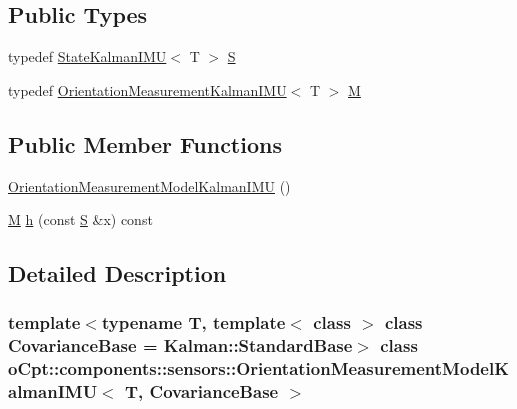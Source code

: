 \subsection*{Public Types}
\begin{DoxyCompactItemize}
\item 
typedef \hyperlink{classo_cpt_1_1components_1_1sensors_1_1_state_kalman_i_m_u}{State\+Kalman\+I\+MU}$<$ T $>$ \hyperlink{classo_cpt_1_1components_1_1sensors_1_1_orientation_measurement_model_kalman_i_m_u_a3104263971226357108cef704d272f90}{S}
\item 
typedef \hyperlink{classo_cpt_1_1components_1_1sensors_1_1_orientation_measurement_kalman_i_m_u}{Orientation\+Measurement\+Kalman\+I\+MU}$<$ T $>$ \hyperlink{classo_cpt_1_1components_1_1sensors_1_1_orientation_measurement_model_kalman_i_m_u_aa47a5c6cf0a9125a5ed587a7fefef876}{M}
\end{DoxyCompactItemize}
\subsection*{Public Member Functions}
\begin{DoxyCompactItemize}
\item 
\hyperlink{classo_cpt_1_1components_1_1sensors_1_1_orientation_measurement_model_kalman_i_m_u_ac1eccbf84f5f25954cdadcb1a5e474b1}{Orientation\+Measurement\+Model\+Kalman\+I\+MU} ()
\item 
\hyperlink{classo_cpt_1_1components_1_1sensors_1_1_orientation_measurement_model_kalman_i_m_u_aa47a5c6cf0a9125a5ed587a7fefef876}{M} \hyperlink{classo_cpt_1_1components_1_1sensors_1_1_orientation_measurement_model_kalman_i_m_u_a8d3bb87295520e0d4b5f02975fa420f0}{h} (const \hyperlink{classo_cpt_1_1components_1_1sensors_1_1_orientation_measurement_model_kalman_i_m_u_a3104263971226357108cef704d272f90}{S} \&x) const
\end{DoxyCompactItemize}


\subsection{Detailed Description}
\subsubsection*{template$<$typename T, template$<$ class $>$ class Covariance\+Base = Kalman\+::\+Standard\+Base$>$\newline
class o\+Cpt\+::components\+::sensors\+::\+Orientation\+Measurement\+Model\+Kalman\+I\+M\+U$<$ T, Covariance\+Base $>$}




